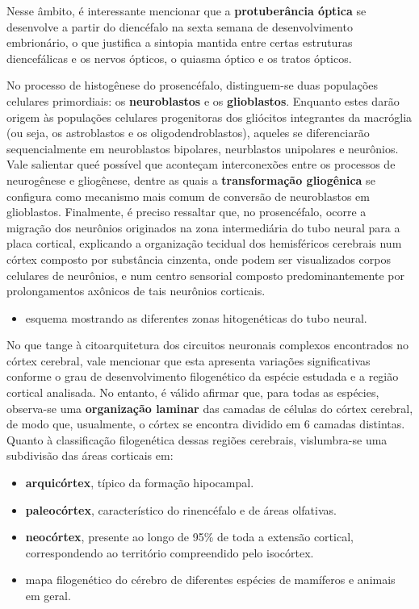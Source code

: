 \documentclass[
]{book}
\providecommand{\tightlist}{%
  \setlength{\itemsep}{0pt}\setlength{\parskip}{0pt}}
\theoremstyle{definition}
\theoremstyle{definition}
\theoremstyle{definition}
\theoremstyle{definition}
\theoremstyle{remark}
\begin{document}
Nesse âmbito, é interessante mencionar que a \textbf{protuberância óptica} se desenvolve a partir do diencéfalo na sexta semana de desenvolvimento embrionário, o que justifica a sintopia mantida entre certas estruturas diencefálicas e os nervos ópticos, o quiasma óptico e os tratos ópticos.

No processo de histogênese do prosencéfalo, distinguem-se duas populações celulares primordiais: os \textbf{neuroblastos} e os \textbf{glioblastos}. Enquanto estes darão origem às populações celulares progenitoras dos gliócitos integrantes da macróglia (ou seja, os astroblastos e os oligodendroblastos), aqueles se diferenciarão sequencialmente em neuroblastos bipolares, neurblastos unipolares e neurônios. Vale salientar queé possível que aconteçam interconexões entre os processos de neurogênese e gliogênese, dentre as quais a \textbf{transformação gliogênica} se configura como mecanismo mais comum de conversão de neuroblastos em glioblastos. Finalmente, é preciso ressaltar que, no prosencéfalo, ocorre a migração dos neurônios originados na zona intermediária do tubo neural para a placa cortical, explicando a organização tecidual dos hemisféricos cerebrais num córtex composto por substância cinzenta, onde podem ser visualizados corpos celulares de neurônios, e num centro sensorial composto predominantemente por prolongamentos axônicos de tais neurônios corticais.

\begin{itemize}
\tightlist
\item
  esquema mostrando as diferentes zonas hitogenéticas do tubo neural.
\end{itemize}

No que tange à citoarquitetura dos circuitos neuronais complexos encontrados no córtex cerebral, vale mencionar que esta apresenta variações significativas conforme o grau de desenvolvimento filogenético da espécie estudada e a região cortical analisada. No entanto, é válido afirmar que, para todas as espécies, observa-se uma \textbf{organização laminar} das camadas de células do córtex cerebral, de modo que, usualmente, o córtex se encontra dividido em 6 camadas distintas. Quanto à classificação filogenética dessas regiões cerebrais, vislumbra-se uma subdivisão das áreas corticais em:

\begin{itemize}
\item
  \textbf{arquicórtex}, típico da formação hipocampal.
\item
  \textbf{paleocórtex}, característico do rinencéfalo e de áreas olfativas.
\item
  \textbf{neocórtex}, presente ao longo de 95\% de toda a extensão cortical, correspondendo ao território compreendido pelo isocórtex.
\item
  mapa filogenético do cérebro de diferentes espécies de mamíferos e animais em geral.
\end{itemize}
\end{document}
